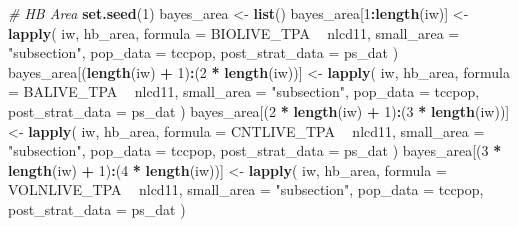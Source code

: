\documentclass[12pt,twoside]{reedthesis}
\newenvironment{Shaded}{\begin{snugshade}}{\end{snugshade}}
\newcommand{\CommentTok}[1]{\textcolor[rgb]{0.56,0.35,0.01}{\textit{#1}}}
\newcommand{\DataTypeTok}[1]{\textcolor[rgb]{0.13,0.29,0.53}{#1}}
\newcommand{\DecValTok}[1]{\textcolor[rgb]{0.00,0.00,0.81}{#1}}
\newcommand{\KeywordTok}[1]{\textcolor[rgb]{0.13,0.29,0.53}{\textbf{#1}}}
\newcommand{\NormalTok}[1]{#1}
\newcommand{\OperatorTok}[1]{\textcolor[rgb]{0.81,0.36,0.00}{\textbf{#1}}}
\newcommand{\StringTok}[1]{\textcolor[rgb]{0.31,0.60,0.02}{#1}}
\begin{document}
\begin{Shaded}
\begin{Highlighting}[]
\CommentTok{# HB Area}
\KeywordTok{set.seed}\NormalTok{(}\DecValTok{1}\NormalTok{)}
\NormalTok{bayes_area <-}\StringTok{ }\KeywordTok{list}\NormalTok{()}
\NormalTok{bayes_area[}\DecValTok{1}\OperatorTok{:}\KeywordTok{length}\NormalTok{(iw)] <-}
\StringTok{  }\KeywordTok{lapply}\NormalTok{(}
\NormalTok{    iw,}
\NormalTok{    hb_area,}
    \DataTypeTok{formula =}\NormalTok{ BIOLIVE_TPA }\OperatorTok{~}\StringTok{ }\NormalTok{nlcd11,}
    \DataTypeTok{small_area =} \StringTok{"subsection"}\NormalTok{,}
    \DataTypeTok{pop_data =}\NormalTok{ tccpop,}
    \DataTypeTok{post_strat_data =}\NormalTok{ ps_dat}
\NormalTok{  )}
\NormalTok{bayes_area[(}\KeywordTok{length}\NormalTok{(iw) }\OperatorTok{+}\StringTok{ }\DecValTok{1}\NormalTok{)}\OperatorTok{:}\NormalTok{(}\DecValTok{2} \OperatorTok{*}\StringTok{ }\KeywordTok{length}\NormalTok{(iw))] <-}
\StringTok{  }\KeywordTok{lapply}\NormalTok{(}
\NormalTok{    iw,}
\NormalTok{    hb_area,}
    \DataTypeTok{formula =}\NormalTok{ BALIVE_TPA }\OperatorTok{~}\StringTok{ }\NormalTok{nlcd11,}
    \DataTypeTok{small_area =} \StringTok{"subsection"}\NormalTok{,}
    \DataTypeTok{pop_data =}\NormalTok{ tccpop,}
    \DataTypeTok{post_strat_data =}\NormalTok{ ps_dat}
\NormalTok{  )}
\NormalTok{bayes_area[(}\DecValTok{2} \OperatorTok{*}\StringTok{ }\KeywordTok{length}\NormalTok{(iw) }\OperatorTok{+}\StringTok{ }\DecValTok{1}\NormalTok{)}\OperatorTok{:}\NormalTok{(}\DecValTok{3} \OperatorTok{*}\StringTok{ }\KeywordTok{length}\NormalTok{(iw))] <-}
\StringTok{  }\KeywordTok{lapply}\NormalTok{(}
\NormalTok{    iw,}
\NormalTok{    hb_area,}
    \DataTypeTok{formula =}\NormalTok{ CNTLIVE_TPA }\OperatorTok{~}\StringTok{ }\NormalTok{nlcd11,}
    \DataTypeTok{small_area =} \StringTok{"subsection"}\NormalTok{,}
    \DataTypeTok{pop_data =}\NormalTok{ tccpop,}
    \DataTypeTok{post_strat_data =}\NormalTok{ ps_dat}
\NormalTok{  )}
\NormalTok{bayes_area[(}\DecValTok{3} \OperatorTok{*}\StringTok{ }\KeywordTok{length}\NormalTok{(iw) }\OperatorTok{+}\StringTok{ }\DecValTok{1}\NormalTok{)}\OperatorTok{:}\NormalTok{(}\DecValTok{4} \OperatorTok{*}\StringTok{ }\KeywordTok{length}\NormalTok{(iw))] <-}
\StringTok{  }\KeywordTok{lapply}\NormalTok{(}
\NormalTok{    iw,}
\NormalTok{    hb_area,}
    \DataTypeTok{formula =}\NormalTok{ VOLNLIVE_TPA }\OperatorTok{~}\StringTok{ }\NormalTok{nlcd11,}
    \DataTypeTok{small_area =} \StringTok{"subsection"}\NormalTok{,}
    \DataTypeTok{pop_data =}\NormalTok{ tccpop,}
    \DataTypeTok{post_strat_data =}\NormalTok{ ps_dat}
\NormalTok{  )}


\end{Highlighting}
\end{Shaded}
\end{document}
